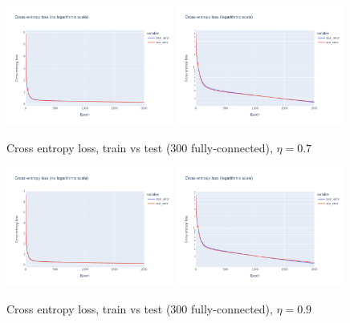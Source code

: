 \documentclass[12pt]{article}
\begin{document}
\begin{figure}[ht]
  \centering
  \includegraphics[width=0.49\textwidth]{images/cross-entropy-comparison-1-300-lr0.7.png}
  \includegraphics[width=0.49\textwidth]{images/cross-entropy-comparison-1-300-lr0.7-log.png}
  \caption{Cross entropy loss, train vs test ($300$ fully-connected), $\eta = 0.7$}
  \label{fig: learning rate comparison 0.7}
\end{figure}
\begin{figure}[ht]
  \centering
  \includegraphics[width=0.49\textwidth]{images/cross-entropy-comparison-1-300-lr0.9.png}
  \includegraphics[width=0.49\textwidth]{images/cross-entropy-comparison-1-300-lr0.9-log.png}
  \caption{Cross entropy loss, train vs test ($300$ fully-connected), $\eta = 0.9$}
  \label{fig: learning rate comparison 0.9}
\end{figure}
\end{document}
